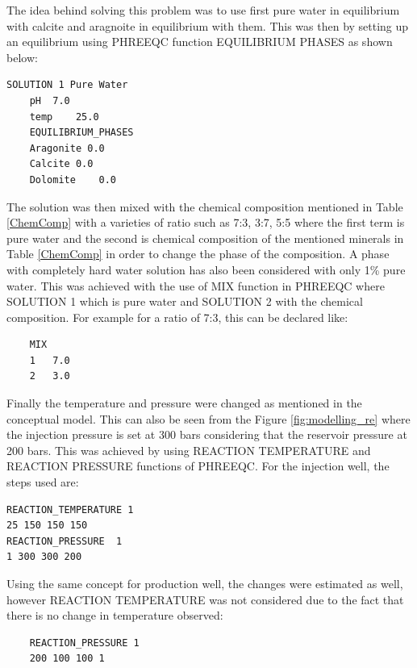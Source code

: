 \newline\newline
The idea behind solving this problem was to use first pure water in equilibrium with calcite and aragnoite in equilibrium with them. This was then by setting up an equilibrium using PHREEQC function EQUILIBRIUM PHASES as shown below: 
\newline
\newline
\begin{verbatim}
SOLUTION 1 Pure Water
	pH	7.0
	temp 	25.0
	EQUILIBRIUM_PHASES 
	Aragonite 0.0
	Calcite 0.0
    Dolomite    0.0
\end{verbatim}
\newline\newline
The solution was then mixed with the chemical composition mentioned in Table \ref{ChemComp} with a varieties of  ratio such as 7:3, 3:7, 5:5 where the first term is pure water and the second is chemical composition of the mentioned minerals in Table \ref{ChemComp} in order to change the phase of the composition. A phase with completely hard water solution has also been considered with only 1\% pure water. \cite{viveiros2015calcium}\cite{KAYA201510} This was achieved with the use of MIX function in PHREEQC where SOLUTION 1 which is pure water and SOLUTION 2 with the chemical composition. For example for a ratio of 7:3, this can be declared like:
\begin{verbatim}
    MIX 
    1   7.0
    2   3.0
\end{verbatim}

Finally the temperature and pressure were changed as mentioned in the conceptual model. This can also be seen from the Figure  \ref{fig:modelling_re} where the injection pressure is set at 300 bars considering that the reservoir pressure at 200 bars. This was achieved by using REACTION TEMPERATURE and REACTION PRESSURE functions of PHREEQC. For the injection well, the steps used are:
\begin{verbatim}
REACTION_TEMPERATURE 1
25 150 150 150 
REACTION_PRESSURE  1
1 300 300 200
\end{verbatim}

\newline
Using the same concept for production well, the changes were estimated as well, however REACTION TEMPERATURE was not considered due to the fact that there is no change in temperature observed:

\begin{verbatim}
    REACTION_PRESSURE 1
    200 100 100 1
\end{verbatim}


